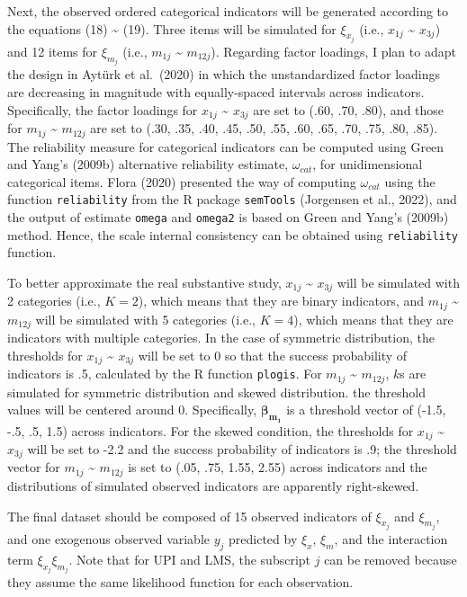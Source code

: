 \documentclass[
  man]{apa7}
\begin{document}
Next, the observed ordered categorical indicators will be generated according to the equations (18) \textasciitilde{} (19). Three items will be simulated for \(\xi_{x_{j}}\) (i.e., \(x_{1j}\) \textasciitilde{} \(x_{3j}\)) and 12 items for \(\xi_{m_{j}}\) (i.e., \(m_{1j}\) \textasciitilde{} \(m_{12j}\)). Regarding factor loadings, I plan to adapt the design in Aytürk et al.~(2020) in which the unstandardized factor loadings are decreasing in magnitude with equally-spaced intervals across indicators. Specifically, the factor loadings for \(x_{1j}\) \textasciitilde{} \(x_{3j}\) are set to (.60, .70, .80), and those for \(m_{1j}\) \textasciitilde{} \(m_{12j}\) are set to (.30, .35, .40, .45, .50, .55, .60, .65, .70, .75, .80, .85). The reliability measure for categorical indicators can be computed using Green and Yang's (2009b) alternative reliability estimate, \(\omega_{cat}\), for unidimensional categorical items. Flora (2020) presented the way of computing \(\omega_{cat}\) using the function \texttt{reliability} from the R package \texttt{semTools} (Jorgensen et al., 2022), and the output of estimate \texttt{omega} and \texttt{omega2} is based on Green and Yang's (2009b) method. Hence, the scale internal consistency can be obtained using \texttt{reliability} function.

To better approximate the real substantive study, \(x_{1j}\) \textasciitilde{} \(x_{3j}\) will be simulated with 2 categories (i.e., \(K = 2\)), which means that they are binary indicators, and \(m_{1j}\) \textasciitilde{} \(m_{12j}\) will be simulated with 5 categories (i.e., \(K = 4\)), which means that they are indicators with multiple categories. In the case of symmetric distribution, the thresholds for \(x_{1j}\) \textasciitilde{} \(x_{3j}\) will be set to 0 so that the success probability of indicators is .5, calculated by the R function \texttt{plogis}. For \(m_{1j}\) \textasciitilde{} \(m_{12j}\), \(k\)s are simulated for symmetric distribution and skewed distribution.
the threshold values will be centered around 0. Specifically, \(\mathbf{\beta_{m_{1}}}\) is a threshold vector of (-1.5, -.5, .5, 1.5) across indicators. For the skewed condition, the thresholds for \(x_{1j}\) \textasciitilde{} \(x_{3j}\) will be set to -2.2 and the success probability of indicators is .9; the threshold vector for \(m_{1j}\) \textasciitilde{} \(m_{12j}\) is set to (.05, .75, 1.55, 2.55) across indicators and the distributions of simulated observed indicators are apparently right-skewed.

The final dataset should be composed of 15 observed indicators of \(\xi_{x_{j}}\) and \(\xi_{m_{j}}\), and one exogenous observed variable \(y_{j}\) predicted by \(\xi_{x}\), \(\xi_{m}\), and the interaction term \(\xi_{x_{j}}\xi_{m_{j}}\). Note that for UPI and LMS, the subscript \(j\) can be removed because they assume the same likelihood function for each observation.
\end{document}
